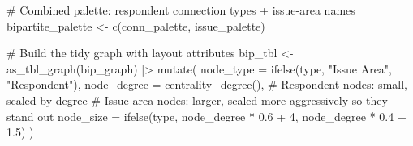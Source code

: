 \documentclass[
  letterpaper,
  DIV=11,
  numbers=noendperiod]{scrartcl}
\newenvironment{Shaded}{\begin{snugshade}}{\end{snugshade}}
\newcommand{\AttributeTok}[1]{\textcolor[rgb]{0.40,0.45,0.13}{#1}}
\newcommand{\CommentTok}[1]{\textcolor[rgb]{0.37,0.37,0.37}{#1}}
\newcommand{\DecValTok}[1]{\textcolor[rgb]{0.68,0.00,0.00}{#1}}
\newcommand{\FloatTok}[1]{\textcolor[rgb]{0.68,0.00,0.00}{#1}}
\newcommand{\FunctionTok}[1]{\textcolor[rgb]{0.28,0.35,0.67}{#1}}
\newcommand{\NormalTok}[1]{\textcolor[rgb]{0.00,0.23,0.31}{#1}}
\newcommand{\OtherTok}[1]{\textcolor[rgb]{0.00,0.23,0.31}{#1}}
\newcommand{\SpecialCharTok}[1]{\textcolor[rgb]{0.37,0.37,0.37}{#1}}
\newcommand{\StringTok}[1]{\textcolor[rgb]{0.13,0.47,0.30}{#1}}
\begin{document}
\begin{Shaded}
\end{Shaded}

\begin{Shaded}
\begin{Highlighting}[]
\CommentTok{\# Combined palette: respondent connection types + issue{-}area names}
\NormalTok{bipartite\_palette }\OtherTok{\textless{}{-}} \FunctionTok{c}\NormalTok{(conn\_palette, issue\_palette)}

\CommentTok{\# Build the tidy graph with layout attributes}
\NormalTok{bip\_tbl }\OtherTok{\textless{}{-}} \FunctionTok{as\_tbl\_graph}\NormalTok{(bip\_graph) }\SpecialCharTok{|\textgreater{}}
  \FunctionTok{mutate}\NormalTok{(}
    \AttributeTok{node\_type   =} \FunctionTok{ifelse}\NormalTok{(type, }\StringTok{"Issue Area"}\NormalTok{, }\StringTok{"Respondent"}\NormalTok{),}
    \AttributeTok{node\_degree =} \FunctionTok{centrality\_degree}\NormalTok{(),}
    \CommentTok{\# Respondent nodes: small, scaled by degree}
    \CommentTok{\# Issue{-}area nodes: larger, scaled more aggressively so they stand out}
    \AttributeTok{node\_size =} \FunctionTok{ifelse}\NormalTok{(type, node\_degree }\SpecialCharTok{*} \FloatTok{0.6} \SpecialCharTok{+} \DecValTok{4}\NormalTok{, node\_degree }\SpecialCharTok{*} \FloatTok{0.4} \SpecialCharTok{+} \FloatTok{1.5}\NormalTok{)}
\NormalTok{  )}


\end{Highlighting}
\end{Shaded}
\end{document}

